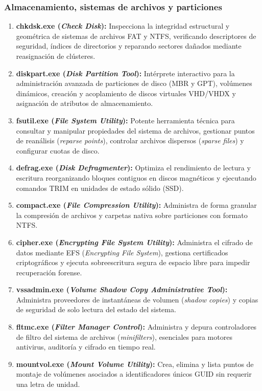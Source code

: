 \documentclass[12pt]{article}
\begin{document}
\subsubsection{Almacenamiento, sistemas de archivos y particiones}
\begin{enumerate}[leftmargin=*, noitemsep, topsep=1pt]
    \item \textbf{chkdsk.exe (\textit{Check Disk}):} Inspecciona la integridad estructural y geométrica de sistemas de archivos FAT y NTFS, verificando descriptores de seguridad, índices de directorios y reparando sectores dañados mediante reasignación de clústeres.
    \item \textbf{diskpart.exe (\textit{Disk Partition Tool}):} Intérprete interactivo para la administración avanzada de particiones de disco (MBR y GPT), volúmenes dinámicos, creación y acoplamiento de discos virtuales VHD/VHDX y asignación de atributos de almacenamiento.
    \item \textbf{fsutil.exe (\textit{File System Utility}):} Potente herramienta técnica para consultar y manipular propiedades del sistema de archivos, gestionar puntos de reanálisis (\textit{reparse points}), controlar archivos dispersos (\textit{sparse files}) y configurar cuotas de disco.
    \item \textbf{defrag.exe (\textit{Disk Defragmenter}):} Optimiza el rendimiento de lectura y escritura reorganizando bloques contiguos en discos magnéticos y ejecutando comandos TRIM en unidades de estado sólido (SSD).
    \item \textbf{compact.exe (\textit{File Compression Utility}):} Administra de forma granular la compresión de archivos y carpetas nativa sobre particiones con formato NTFS.
    \item \textbf{cipher.exe (\textit{Encrypting File System Utility}):} Administra el cifrado de datos mediante EFS (\textit{Encrypting File System}), gestiona certificados criptográficos y ejecuta sobreescritura segura de espacio libre para impedir recuperación forense.
    \item \textbf{vssadmin.exe (\textit{Volume Shadow Copy Administrative Tool}):} Administra proveedores de instantáneas de volumen (\textit{shadow copies}) y copias de seguridad de solo lectura del estado del sistema.
    \item \textbf{fltmc.exe (\textit{Filter Manager Control}):} Administra y depura controladores de filtro del sistema de archivos (\textit{minifilters}), esenciales para motores antivirus, auditoría y cifrado en tiempo real.
    \item \textbf{mountvol.exe (\textit{Mount Volume Utility}):} Crea, elimina y lista puntos de montaje de volúmenes asociados a identificadores únicos GUID sin requerir una letra de unidad.

\end{enumerate}
\end{document}
